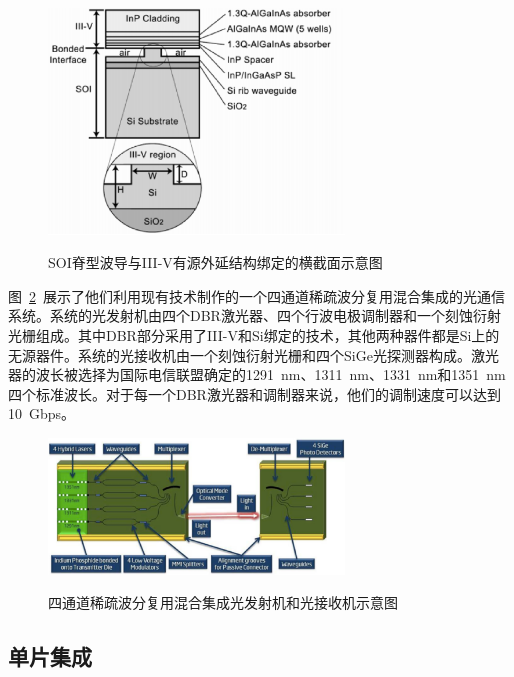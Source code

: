 \documentclass{ZJUthesis}
\begin{document}
\begin{figure}[htbp]
  \centering
  \includegraphics[width=0.7\textwidth]{./Pictures/hybrid.eps}\\
  \caption{SOI脊型波导与III-V有源外延结构绑定的横截面示意图\cite{Park2005Hybrid}}
  \label{fig_hybrid}
\end{figure}

图~\ref{fig_hybrid2}~展示了他们利用现有技术制作的一个四通道稀疏波分复用混合集成的光通信系统\cite{Alduino2010Demonstration}。系统的光发射机由四个DBR激光器、四个行波电极调制器和一个刻蚀衍射光栅组成。其中DBR部分采用了III-V和Si绑定的技术，其他两种器件都是Si上的无源器件。系统的光接收机由一个刻蚀衍射光栅和四个SiGe光探测器构成。激光器的波长被选择为国际电信联盟确定的1291~nm、1311~nm、1331~nm和1351~nm四个标准波长。对于每一个DBR激光器和调制器来说，他们的调制速度可以达到10~Gbps。

\begin{figure}[htbp]
  \centering
  \includegraphics[width=0.7\textwidth]{./Pictures/hybrid2.eps}\\
  \caption{四通道稀疏波分复用混合集成光发射机和光接收机示意图\cite{Alduino2010Demonstration}}
  \label{fig_hybrid2}
\end{figure}

\subsection{单片集成}
\end{document}
